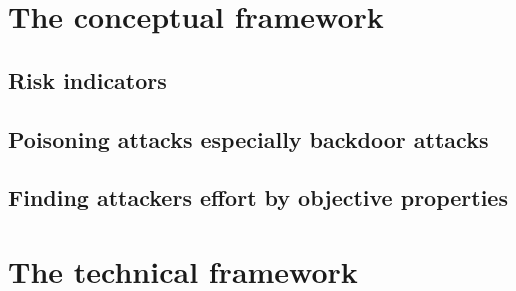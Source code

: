 \section{The conceptual framework}
\label{sec:conFrame}

\subsection{Risk indicators}
\label{sec:risk_indicators}

\subsection{Poisoning attacks especially backdoor attacks}
\label{sec:backdoor}

\subsection{Finding attackers effort by objective properties}

\newpage

\section{The technical framework}
\label{sec:techFrame}
